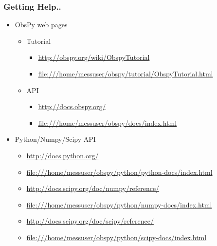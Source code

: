 \documentclass[t,10pt,compress=false,usepdftitle=false]{beamer}
\begin{document}
\begin{frame}[fragile]
    \frametitle{Getting Help..}
    \begin{itemize}
    \item ObsPy web pages
        \begin{itemize}
        \item Tutorial
            \begin{itemize}
            \item \url{http://obspy.org/wiki/ObspyTutorial}
            \item \url{file:///home/messuser/obspy/tutorial/ObspyTutorial.html}
            \end{itemize}
        \item API
            \begin{itemize}
            \item \url{http://docs.obspy.org/}
            \item \url{file:///home/messuser/obspy/docs/index.html}
            \end{itemize}
        \end{itemize}
    \item Python/Numpy/Scipy API
        \begin{itemize}
        \item \url{http://docs.python.org/}
        \item \url{file:///home/messuser/obspy/python/python-docs/index.html}
        \item \url{http://docs.scipy.org/doc/numpy/reference/}
        \item \url{file:///home/messuser/obspy/python/numpy-docs/index.html}
        \item \url{http://docs.scipy.org/doc/scipy/reference/}
        \item \url{file:///home/messuser/obspy/python/scipy-docs/index.html}
        \end{itemize}
    \end{itemize}
\end{frame}
\end{document}
